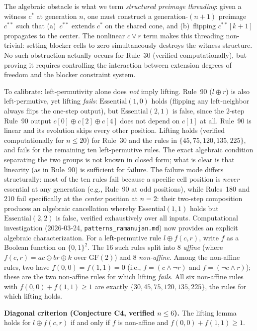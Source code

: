 \documentclass[11pt]{article}
\theoremstyle{plain}
\theoremstyle{definition}
\newcommand{\Essential}{\mathrm{Essential}}
\begin{document}
The algebraic obstacle is what we term \emph{structured preimage threading}: given
a witness $c^*$ at generation $n$, one must construct a generation-$(n+1)$ preimage
$c^{**}$ such that (a)~$c^{**}$ extends $c^*$ on the shared cone, and (b)~flipping
$c^{**}[k+1]$ propagates to the center.  The nonlinear $c \lor r$ term makes this
threading non-trivial: setting blocker cells to zero simultaneously destroys the
witness structure.  No such obstruction actually occurs for Rule~30 (verified
computationally), but proving it requires controlling the interaction between
extension degrees of freedom and the blocker constraint system.

To calibrate: left-permutivity alone does \emph{not} imply lifting.  Rule~90
($l \oplus r$) is also left-permutive, yet lifting \emph{fails}: $\Essential(1,0)$
holds (flipping any left-neighbor always flips the one-step output), but
$\Essential(2,1)$ is false, since the 2-step Rule~90 output
$c[0] \oplus c[2] \oplus c[4]$ does not depend on $c[1]$ at all.  Rule~90 is
linear and its evolution skips every other position.  Lifting holds (verified
computationally for $n \leq 20$) for Rule~30 and the rules in $\{45, 75, 120,
135, 225\}$, and fails for the remaining ten left-permutive rules.  The exact
algebraic condition separating the two groups is not known in closed form; what is
clear is that linearity (as in Rule~90) is sufficient for failure.  The failure
mode differs structurally: most of the ten rules fail because a specific cell
position is \emph{never} essential at any generation (e.g., Rule~90 at odd
positions), while Rules~180 and 210 fail specifically at the \emph{center} position
at $n = 2$: their two-step composition produces an algebraic cancellation whereby
$\Essential(1,1)$ holds but $\Essential(2,2)$ is false, verified exhaustively over
all inputs.  Computational investigation (2026-03-24, \texttt{patterns\_ramanujan.md}) now provides
an explicit algebraic characterization.  For a left-permutive rule $l \oplus f(c,r)$,
write $f$ as a Boolean function on $\{0,1\}^2$.  The 16 such rules split into 8 \emph{affine}
(where $f(c,r) = ac \oplus br \oplus k$ over $\mathrm{GF}(2)$) and 8 \emph{non-affine}.
Among the non-affine rules, two have $f(0,0) = f(1,1) = 0$
(i.e., $f = (c \wedge \neg r)$ and $f = (\neg c \wedge r)$); these are the two non-affine
rules for which lifting \emph{fails}.  All six non-affine rules with $f(0,0) + f(1,1) \geq 1$
are exactly $\{30, 45, 75, 120, 135, 225\}$, the rules for which lifting holds.

\textbf{Diagonal criterion (Conjecture C4, verified $n \leq 6$).}
The lifting lemma holds for $l \oplus f(c,r)$ if and only if $f$ is non-affine
and $f(0,0) + f(1,1) \geq 1$.
\end{document}
